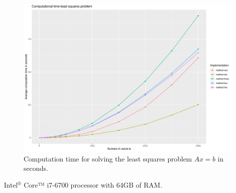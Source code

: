 \begin{figure}
	\centering
	\includegraphics[width=\textwidth]{figures/chapter_NNLS/computation_time}
	\caption{Computation time for solving the least squares problem $Ax = b$ in seconds.}
	\label{fig:comp_time}
\end{figure}

Intel$^{®}$ Core™ i7-6700 processor with 64GB of RAM. 

